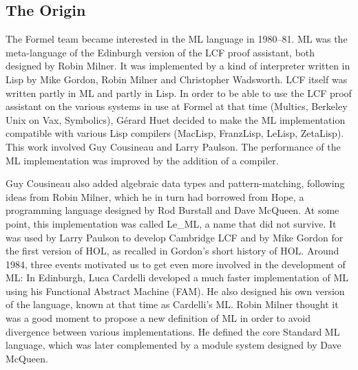 \documentclass[14pt]{matmex-diploma-custom}
\begin{document}
\subsection{The Origin}
The Formel team became interested in the ML language in 1980–81. ML was the meta-language of the Edinburgh version of the LCF proof assistant, both designed by Robin Milner. It was implemented by a kind of interpreter written in Lisp by Mike Gordon, Robin Milner and Christopher Wadsworth. LCF itself was written partly in ML and partly in Lisp. In order to be able to use the LCF proof assistant on the various systems in use at Formel at that time (Multics, Berkeley Unix on Vax, Symbolics), Gérard Huet decided to make the ML implementation compatible with various Lisp compilers (MacLisp, FranzLisp, LeLisp, ZetaLisp). This work involved Guy Cousineau and Larry Paulson. The performance of the ML implementation was improved by the addition of a compiler.

Guy Cousineau also added algebraic data types and pattern-matching, following ideas from Robin Milner, which he in turn had borrowed from Hope, a programming language designed by Rod Burstall and Dave McQueen. At some point, this implementation was called Le\_ML, a name that did not survive. It was used by Larry Paulson to develop Cambridge LCF and by Mike Gordon for the first version of HOL, as recalled in Gordon's short history of HOL.
Around 1984, three events motivated us to get even more involved in the development of ML:
In Edinburgh, Luca Cardelli developed a much faster implementation of ML using his Functional Abstract Machine (FAM). He also designed his own version of the language, known at that time as Cardelli's ML.
Robin Milner thought it was a good moment to propose a new definition of ML in order to avoid divergence between various implementations. He defined the core Standard ML language, which was later complemented by a module system designed by Dave McQueen.
\end{document}
